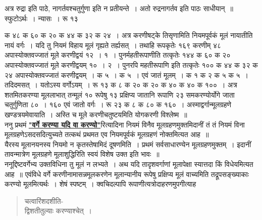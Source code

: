 \documentclass[11pt, openany]{book}
\begin{document}
 अत्र रुद्रा इति पाठे, नागर्तवश्चतुर्गुणा इति न प्रतीयन्ते~। 
अतो रुद्रनागर्तव इति पाठः साधीयान्~॥ स्फुटोऽर्थः~। न्यासः~। रू १३ 

\newpage%

\noindent क ४८ क ६० क २० क ४४ क ३२ क २४~। अत्र करणीषट्के तिसृणामिति नियमपूर्वकं मूलं नायातीति नायं वर्गः~। यदि तु नियमं 
विहाय मूलं गृह्यते तर्ह्यसत्~। तथाहि रूपकृतेः १६९ करणीम् ४८ 
अपास्योक्तवज्जातं मूले करणीद्वयं १२~। १~। पुनर्महतीरूपाणीति तत्कृतेः
१४४ क ६० क २० अपास्योक्तवज्जातं मूले करणीद्वयम् १०~। २~। पुनरपि 
महतीरूपाणि इति तत्कृतेः १०० क ४४ क ३२ क २४ अपास्योक्तवज्जातं 
करणीद्वयम्~। क ५~। क ५~। एवं जातं मूलम्~। क १ क २ क ५ क ५~। 
तदिदमसत्~। यतोऽस्य वर्गोऽयम्~। रू १३ क ८ क २० क २० क ४० 
क ४० क १००~। अत्र शतमितकरण्या मूललाभात् तन्मूलं १० रूपेषु १३ 
प्रक्षिप्य जातानि रूपाणि २३ समकरण्योर्योगे जाता चतुर्गुणिता ८०~। १६० 
एवं जातो वर्गः~। रू २३ क ८ क ८० क १६०~। अस्माद्वर्गान्मूलग्रहणे
खण्डत्रयमेवायाति~। अस्ति च मूले करणीचतुष्टयमिति योगकरणी विश्लेष्म~॥ \\

\vspace{-3mm}
 ननु प्रथमं \hyperref[19]{\textbf{"वर्गे करण्या यदि वा करण्यो"}}रित्यादिना नियमं विनैव मूलग्रहणमुक्तमिदानीं तं तं नियमं विना मूलग्रहणेऽसदसदित्युच्यते तत्कथं प्रथमत एव नियमपूर्वकं मूलग्रहणं नोक्तमित्यत आह~॥ \\

\vspace{-3mm}
 यैरस्य मूलानयनस्य नियमो न कृतस्तेषामिदं दूषणमिति~। प्रथमं 
सर्वसाधारण्येन मूलग्रहणमुक्तम्~। इदानीं तावन्मात्रेण मूलग्रहणे
मूलाशुद्धिरिति स्वयं विशेष उक्त इति भावः~॥ \\

\vspace{-3mm}
 ननूद्दिष्टवर्गेभ्य उक्तविधिना तु मूलं न लभ्यते~। अथ यदि 
तादृशवर्गाणां मूलापेक्षा स्यात्तदा किं विधेयमित्यत आह~॥ एवंविधे 
वर्गे करणीनामासन्नमूलकरणेन मूलान्यानीय रूपेषु प्रक्षिप्य मूलं वाच्यमिति तद्रूपसङ्ख्याकाः करण्यो मूलमित्यर्थः~। शेषं स्पष्टम्~। क्वचिदल्पापि 
रूपाणीत्यत्रोदाहरणमुपगीत्याह\textendash   
\begin{quote}
    \ex

 चत्वारिंशदशीति-\\
 
 \vspace{-7mm}
\hspace{1cm} द्विशतीतुल्याः करण्याश्चेत्~।\\
\end{quote}
\end{document}
